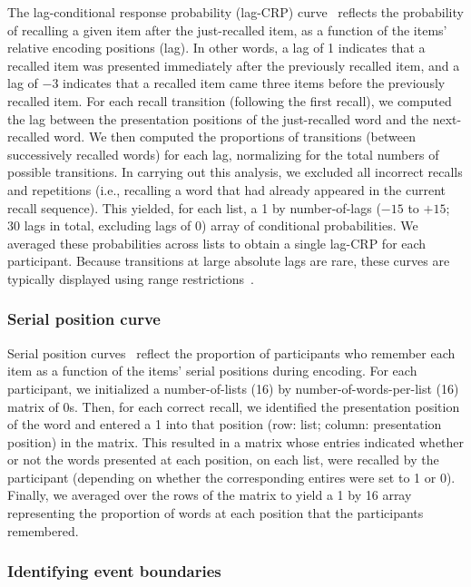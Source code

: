 \documentclass[11pt]{article}
\begin{document}
The lag-conditional response probability (lag-CRP) curve~\citep{Kaha96}
reflects the probability of recalling a given item after the just-recalled
item, as a function of the items' relative encoding positions (lag). In other
words, a lag of 1 indicates that a recalled item was presented immediately
after the previously recalled item, and a lag of $-3$ indicates that a recalled
item came three items before the previously recalled item. For each recall
transition (following the first recall), we computed the lag between the
presentation positions of the just-recalled word and the next-recalled word. We
then computed the proportions of transitions (between successively recalled
words) for each lag, normalizing for the total numbers of possible transitions.
In carrying out this analysis, we excluded all incorrect recalls and
repetitions (i.e., recalling a word that had already appeared in the current
recall sequence). This yielded, for each list, a 1 by number-of-lags ($-15$ to
$+15$; 30 lags in total, excluding lags of 0) array of conditional
probabilities. We averaged these probabilities across lists to obtain a single
lag-CRP for each participant. Because transitions at large absolute lags are
rare, these curves are typically displayed using range
restrictions~\citep{Kaha12}.



\subsubsection*{Serial position curve}

Serial position curves~\citep{Murd62a} reflect the proportion of participants
who remember each item as a function of the items' serial positions during
encoding. For each participant, we initialized a number-of-lists (16) by
number-of-words-per-list (16) matrix of 0s. Then, for each correct recall, we
identified the presentation position of the word and entered a 1 into that
position (row: list; column: presentation position) in the matrix. This
resulted in a matrix whose entries indicated whether or not the words presented
at each position, on each list, were recalled by the participant (depending on
whether the corresponding entires were set to 1 or 0). Finally, we averaged
over the rows of the matrix to yield a 1 by 16 array representing the
proportion of words at each position that the participants remembered.

\subsubsection*{Identifying event boundaries}
\end{document}
